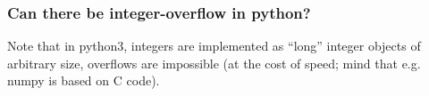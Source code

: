 
\subsubsection{Can there be integer-overflow in python?}
Note that in python3, integers are implemented as “long” integer objects of arbitrary size, overflows are
impossible (at the cost of speed; mind that e.g. numpy is based on C code).

